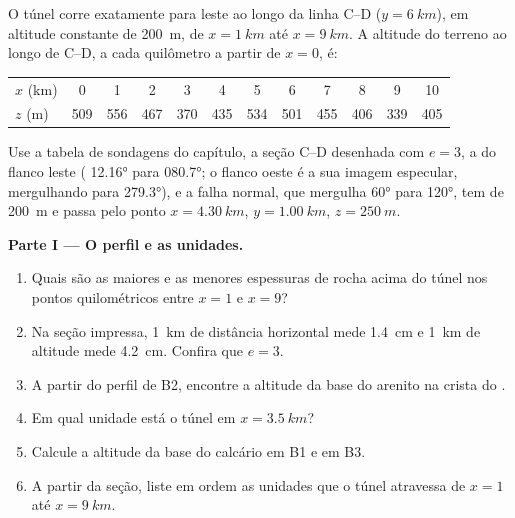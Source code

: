\begin{problem}
\label{pb:b1:cross-sections:1}
O túnel corre exatamente para leste ao longo da linha C--D ($y = \qty{6}{km}$), em altitude constante de \qty{200}{m}, de $x = \qty{1}{km}$ até $x =
\qty{9}{km}$. A altitude do terreno ao longo de C--D, a cada quilômetro a partir de $x = 0$, é:
\begin{center}
\small
\begin{tabular}{lccccccccccc}
\hline
$x$ (km) & 0 & 1 & 2 & 3 & 4 & 5 & 6 & 7 & 8 & 9 & 10 \\
$z$ (m) & 509 & 556 & 467 & 370 & 435 & 534 & 501 & 455 & 406 & 339 & 405 \\
\hline
\end{tabular}
\end{center}
Use a tabela de sondagens do capítulo, a seção C--D desenhada com $e = 3$, a  do flanco leste ( \ang{12.16} para \ang{080.7}; o flanco oeste é a sua imagem especular, mergulhando para \ang{279.3}), e a falha normal, que mergulha \ang{60} para \ang{120}, tem  de \qty{200}{m} e passa pelo ponto $x = \qty{4.30}{km}$, $y = \qty{1.00}{km}$,
$z = \qty{250}{m}$.

\medskip
\noindent\textbf{Parte I --- O perfil e as unidades.}
\begin{enumerate}
  \item Quais são as maiores e as menores espessuras de rocha acima do túnel nos pontos quilométricos entre $x = 1$ e $x = 9$?
  \item Na seção impressa, \qty{1}{km} de distância horizontal mede \qty{1.4}{cm} e \qty{1}{km} de altitude mede \qty{4.2}{cm}. Confira que $e = 3$.
  \item A partir do perfil de B2, encontre a altitude da base do arenito na crista do .
  \item Em qual unidade está o túnel em $x = \qty{3.5}{km}$?
  \item Calcule a altitude da base do calcário em B1 e em B3.
  \item A partir da seção, liste em ordem as unidades que o túnel atravessa de $x = 1$ até $x = \qty{9}{km}$.
\end{enumerate}


\end{problem}

